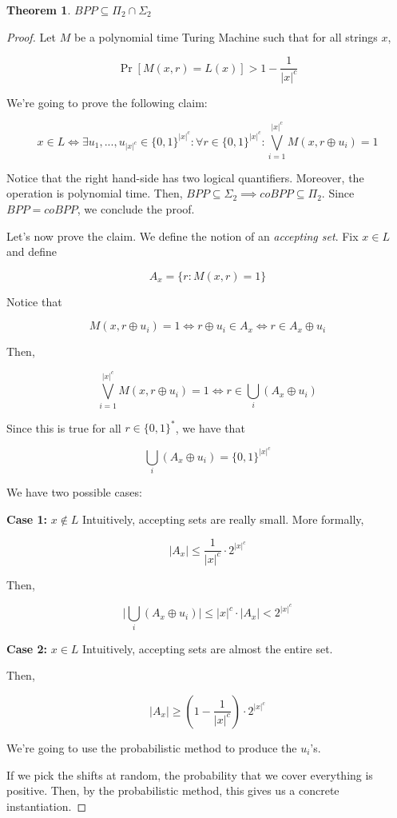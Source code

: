 \documentclass{article}
\theoremstyle{definition}
\newtheorem{theorem}{Theorem}[section]
\newcommand{\xtoc}{\lvert x \rvert ^{c}}
\begin{document}
\begin{theorem}
    $BPP \subseteq \Pi_{2} \cap \Sigma_{2}$
\end{theorem}
\begin{proof}
    Let $M$ be a polynomial time Turing Machine such that for all strings $x$,

    \[ \Pr[M(x,r) = L(x)] > 1 - \frac{1}{\lvert x \rvert ^{c}}\]

    We're going to prove the following claim: 

    \[ x \in L \iff \exists u_{1},...,u_{\lvert x \rvert^{c}} \in \{0,1\}^{\lvert x \rvert ^{c}}: \forall r \in \{0,1\}^{\lvert x \rvert ^{c}}: \bigvee_{i=1}^{\lvert x \rvert^{c}} M(x,r \oplus u_{i}) = 1\]

    Notice that the right hand-side has two logical quantifiers. Moreover, the operation is polynomial time. Then, $BPP \subseteq \Sigma_{2} \implies coBPP \subseteq \Pi_{2}$. Since $BPP = coBPP$, we conclude the proof.

    Let's now prove the claim. We define the notion of an \textit{accepting set}. Fix $x \in L$ and define 

    \[ A_{x} = \{ r: M(x,r) = 1\}\]

    Notice that 

    \[ M(x,r \oplus u_{i}) = 1 \iff r \oplus u_{i} \in A_{x} \iff r \in A_{x} \oplus u_{i}\]

    Then,

    \[ \bigvee_{i=1}^{\lvert x \rvert^{c}} M(x,r \oplus u_{i}) = 1 \iff r \in \bigcup_{i} (A_{x} \oplus u_{i})\]

    Since this is true for all $r \in \{0,1\}^{*}$, we have that 

    \[ \bigcup_{i} (A_{x} \oplus u_{i}) = \{0,1\}^{\lvert x \rvert ^{c}}\]

    We have two possible cases:

    \textbf{Case 1:} $x \notin L$
    Intuitively, accepting sets are really small. More formally,

    \[ \lvert A_{x} \rvert \leq \frac{1}{\xtoc} \cdot 2^{\xtoc}\]

    Then, 

    \[\lvert \bigcup_{i} (A_{x} \oplus u_{i}) \rvert \leq \xtoc \cdot \lvert A_{x} \rvert < 2^{\xtoc}\]
    

    \textbf{Case 2:} $x \in L$
    Intuitively, accepting sets are almost the entire set. 

    Then, 

    \[ \lvert A_{x} \rvert \geq (1 - \frac{1}{\xtoc}) \cdot 2^{\xtoc}\]

    We're going to use the probabilistic method to produce the $u_{i}$'s. 

    If we pick the shifts at random, the probability that we cover everything is positive. Then, by the probabilistic method, this gives us a concrete instantiation. 
\end{proof}
\end{document}
